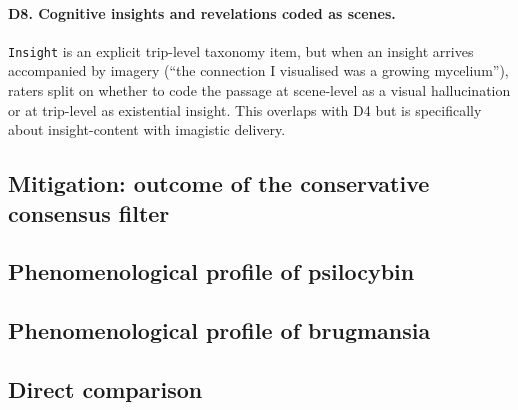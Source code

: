 \paragraph{D8. Cognitive insights and revelations coded as scenes.}
\texttt{Insight} is an explicit trip-level taxonomy item, but when an insight arrives accompanied by imagery (``the connection I visualised was a growing mycelium''), raters split on whether to code the passage at scene-level as a visual hallucination or at trip-level as existential insight. This overlaps with D4 but is specifically about insight-content with imagistic delivery.

\subsection{Mitigation: outcome of the conservative consensus filter}

\subsection{Phenomenological profile of psilocybin}

\subsection{Phenomenological profile of brugmansia}

\subsection{Direct comparison}
